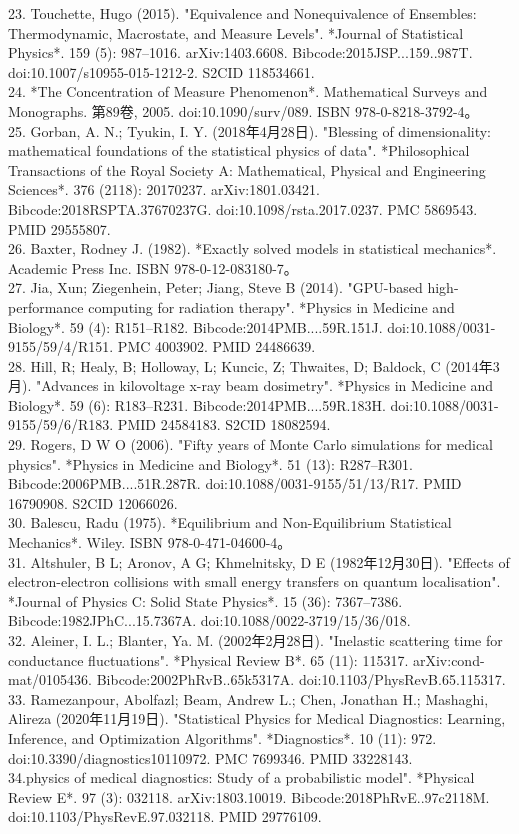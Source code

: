 23. Touchette, Hugo (2015). "Equivalence and Nonequivalence of Ensembles: Thermodynamic, Macrostate, and Measure Levels". *Journal of Statistical Physics*. 159 (5): 987–1016. arXiv:1403.6608. Bibcode:2015JSP...159..987T. doi:10.1007/s10955-015-1212-2. S2CID 118534661.\\
24. *The Concentration of Measure Phenomenon*. Mathematical Surveys and Monographs. 第89卷, 2005. doi:10.1090/surv/089. ISBN 978-0-8218-3792-4。\\
25. Gorban, A. N.; Tyukin, I. Y. (2018年4月28日). "Blessing of dimensionality: mathematical foundations of the statistical physics of data". *Philosophical Transactions of the Royal Society A: Mathematical, Physical and Engineering Sciences*. 376 (2118): 20170237. arXiv:1801.03421. Bibcode:2018RSPTA.37670237G. doi:10.1098/rsta.2017.0237. PMC 5869543. PMID 29555807.\\
26. Baxter, Rodney J. (1982). *Exactly solved models in statistical mechanics*. Academic Press Inc. ISBN 978-0-12-083180-7。\\
27. Jia, Xun; Ziegenhein, Peter; Jiang, Steve B (2014). "GPU-based high-performance computing for radiation therapy". *Physics in Medicine and Biology*. 59 (4): R151–R182. Bibcode:2014PMB....59R.151J. doi:10.1088/0031-9155/59/4/R151. PMC 4003902. PMID 24486639.\\
28. Hill, R; Healy, B; Holloway, L; Kuncic, Z; Thwaites, D; Baldock, C (2014年3月). "Advances in kilovoltage x-ray beam dosimetry". *Physics in Medicine and Biology*. 59 (6): R183–R231. Bibcode:2014PMB....59R.183H. doi:10.1088/0031-9155/59/6/R183. PMID 24584183. S2CID 18082594.\\
29. Rogers, D W O (2006). "Fifty years of Monte Carlo simulations for medical physics". *Physics in Medicine and Biology*. 51 (13): R287–R301. Bibcode:2006PMB....51R.287R. doi:10.1088/0031-9155/51/13/R17. PMID 16790908. S2CID 12066026.\\
30. Balescu, Radu (1975). *Equilibrium and Non-Equilibrium Statistical Mechanics*. Wiley. ISBN 978-0-471-04600-4。\\
31. Altshuler, B L; Aronov, A G; Khmelnitsky, D E (1982年12月30日). "Effects of electron-electron collisions with small energy transfers on quantum localisation". *Journal of Physics C: Solid State Physics*. 15 (36): 7367–7386. Bibcode:1982JPhC...15.7367A. doi:10.1088/0022-3719/15/36/018.\\
32. Aleiner, I. L.; Blanter, Ya. M. (2002年2月28日). "Inelastic scattering time for conductance fluctuations". *Physical Review B*. 65 (11): 115317. arXiv:cond-mat/0105436. Bibcode:2002PhRvB..65k5317A. doi:10.1103/PhysRevB.65.115317.\\
33. Ramezanpour, Abolfazl; Beam, Andrew L.; Chen, Jonathan H.; Mashaghi, Alireza (2020年11月19日). "Statistical Physics for Medical Diagnostics: Learning, Inference, and Optimization Algorithms". *Diagnostics*. 10 (11): 972. doi:10.3390/diagnostics10110972. PMC 7699346. PMID 33228143.\\
34.physics of medical diagnostics: Study of a probabilistic model". *Physical Review E*. 97 (3): 032118. arXiv:1803.10019. Bibcode:2018PhRvE..97c2118M. doi:10.1103/PhysRevE.97.032118. PMID 29776109.\\
